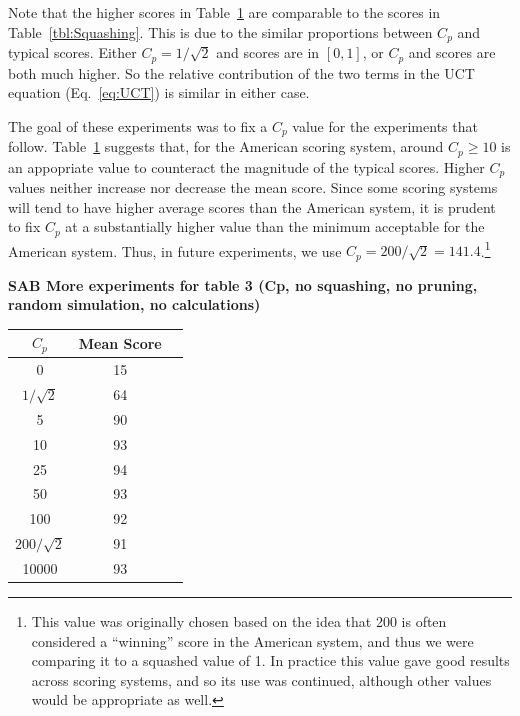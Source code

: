 \documentclass[letterpaper]{article}
\begin{document}
Note that the higher scores in Table~\ref{tbl:noSquashing} are comparable to the scores in Table~\ref{tbl:Squashing}. This is due to the similar proportions between $C_p$ and typical scores. Either $C_p  = 1 / \sqrt{2}$ and scores are in $[0,1]$, or $C_p$ and scores are both much higher. So the relative contribution of the two terms in the UCT equation (Eq.~\ref{eq:UCT}) is similar in either case.

The goal of these experiments was to fix a $C_p$ value for the experiments that follow. Table~\ref{tbl:noSquashing} suggests that, for the American scoring system, around $C_p \geq 10$ is an appopriate value to counteract the magnitude of the typical scores. Higher $C_p$ values neither increase nor decrease the mean score. Since some scoring systems will tend to have higher average scores than the American system, it is prudent to fix $C_p$ at a substantially higher value than the minimum acceptable for the American system. Thus, in future experiments, we use $C_p = 200 / \sqrt{2} = 141.4$.\footnote{This value was originally chosen based on the idea that 200 is often considered a ``winning'' score in the American system, and thus we were comparing it to a squashed value of 1. In practice this value gave good results across scoring systems, and so its use was continued, although other values would be appropriate as well.}

{\bf SAB More experiments for table 3 (Cp, no squashing, no pruning, random simulation, no calculations)}


\begin{table}
\label{tbl:noSquashing}
\centering
\begin{tabular}{c c c}
\hline
$C_p$ & Mean Score \\
\hline
0 & 15 \\
$1 / \sqrt{2}$ & 64 \\
5 & 90 \\
10 & 93 \\
25 & 94 \\
50 & 93 \\
100 & 92 \\
$200 / \sqrt{2}$ & 91 \\
10000 & 93 \\
\hline
\end{tabular}
\end{table}
\end{document}
